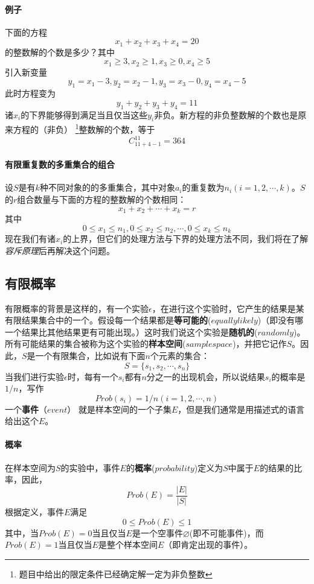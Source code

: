 \documentclass{ctexart}
\begin{document}
     \paragraph{例子}下面的方程
     \[x_1 + x_2 + x_3 + x_4 = 20\]
     的整数解的个数是多少？其中
     \[x_ 1 \geqslant 3 , x_2 \geqslant 1 ,x_3 \geqslant 0 ,x_4 \geqslant 5\]
     引入新变量
     \[y_1 = x_1 -3 , y_2 = x_2 - 1 , y_3 = x _3 - 0 ,y_4 = x_4 -5\]
     此时方程变为
     \[y_1 + y_2 + y_3 + y_4 = 11\]
     诸$x_i$的下界能够得到满足当且仅当这些$y_i$非负。新方程的非负整数解的个数也是原来方程的（非负）
     \footnote{题目中给出的限定条件已经确定解一定为非负整数}整数解的个数，等于
     \[C_{11+4-1}^{11} = 364\]
     \paragraph{有限重复数的多重集合的组合}
     设$S$是有$k$种不同对象的的多重集合，其中对象$a_i$的重复数为$n_i(i = 1,2,\cdots,k)$。$S$的$r$组合数量与下面的方程的整数解的个数相同：
     \[x_1 + x_2 + \cdots + x_k = r\]
     其中
     \[0 \leqslant x_1 \leqslant n_1 , 0 \leqslant x_2 \leqslant n_2,\cdots , 0 \leqslant x_k \leqslant n_k\]
     现在我们有诸$x_i$的上界，但它们的处理方法与下界的处理方法不同，我们将在了解\textit{容斥原理}后再解决这个问题。
   \subsection{有限概率}
   有限概率的背景是这样的，有一个实验$\epsilon$，在进行这个实验时，它产生的结果是某有限结果集合中的一个。假设每一个结果都是\textbf{等可能的}($equally likely$)（即没有哪一个结果比其他结果更有可能出现。）这时我们说这个实验是\textbf{随机的}($randomly$)。所有可能结果的集合被称为这个实验的\textbf{样本空间}($sample space$)，并把它记作$S$。因此，$S$是一个有限集合，比如说有下面$n$个元素的集合：
   \[S = \{s_1 , s_2 , \cdots ,s_n\}\]
   当我们进行实验$\epsilon$时，每有一个$s_i$都有$n$分之一的出现机会，所以说结果$s_i$的概率是$1/n$，写作
   \[Prob(s_i) = 1/n (i = 1,2,\cdots,n)\]
   一个\textbf{事件}（$event$） 就是样本空间的一个子集$E$，但是我们通常是用描述式的语言给出这个$E$。
   \paragraph{概率} 在样本空间为$S$的实验中，事件$E$的\textbf{概率}($probability$)定义为$S$中属于$E$的结果的比率，因此，
   \[Prob(E) = \frac{|E|}{|S|}\]
   根据定义，事件$E$满足
   \[ 0 \leqslant Prob(E) \leqslant 1\]
   其中，当$Prob(E) = 0$当且仅当$E$是一个空事件$\varnothing$(即不可能事件)，而$Prob(E) =1$当且仅当$E$是整个样本空间$E$（即肯定出现的事件）。
\end{document}
